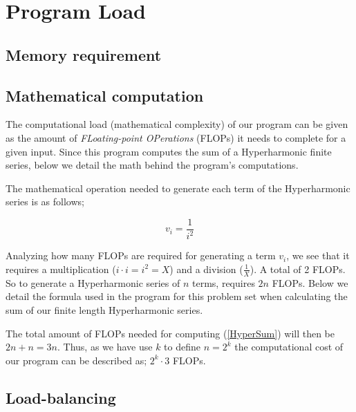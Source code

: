 \documentclass[fontsize=11pt,paper=a4,titlepage]{report}
\begin{document}


\section{Program Load}

\subsection{Memory requirement}




\subsection{Mathematical computation}

The computational load (mathematical complexity) of our program can be given as
the amount of \textit{FLoating-point OPerations} (FLOPs) it needs to complete
for a given input. Since this program computes the sum of a Hyperharmonic finite
series, below we detail the math behind the program's computations.

The mathematical operation needed to generate each term of the Hyperharmonic
series is as follows;

\begin{equation}
	v_i = \frac{1}{i^2}
\end{equation}

Analyzing how many FLOPs are required for generating a term $v_i$, we see that
it requires a multiplication ($i\cdot i = i^2 = X$) and a division
($\frac{1}{X}$). A total of 2 FLOPs. So to generate a Hyperharmonic series of
$n$ terms, requires $2n$ FLOPs. Below we detail the formula used in the program
for this problem set when calculating the sum of our finite length Hyperharmonic
series.

The total amount of FLOPs needed for computing (\ref{HyperSum}) will then be $2n + n = 3n$.
Thus, as we have use $k$ to define $n=2^k$ the computational cost of our program
can be described as; $2^k\cdot 3$ FLOPs.

\subsection{Load-balancing}
\end{document}
